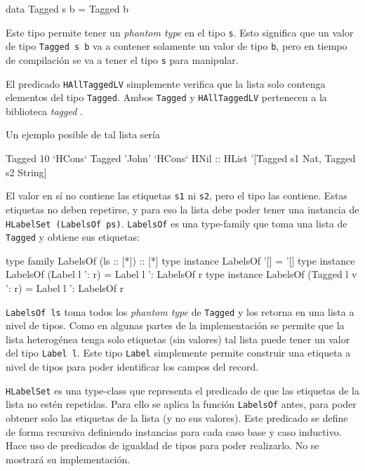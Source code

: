 \begin{code}
data Tagged s b = Tagged b
\end{code}

Este tipo permite tener un \textit{phantom type} en el tipo \texttt{s}. Esto significa que un valor de tipo \texttt{Tagged s b} va a contener solamente un valor de tipo \texttt{b}, pero en tiempo de compilación se va a tener el tipo \texttt{s} para manipular.

El predicado \texttt{HAllTaggedLV} simplemente verifica que la lista solo contenga elementos del tipo \texttt{Tagged}. Ambos \texttt{Tagged} y \texttt{HAllTaggedLV} pertenecen a la biblioteca \textit{tagged} \cite{Haskell:Tagged}. 

Un ejemplo posible de tal lista sería

\begin{code}
Tagged 10 `HCons` Tagged 'John' `HCons` HNil :: 
  HList '[Tagged s1 Nat, Tagged s2 String]
\end{code}

El valor en sí no contiene las etiquetas \texttt{s1} ni \texttt{s2}, pero el tipo las contiene. Estas etiquetas no deben repetirse, y para eso la lista debe poder tener una instancia de \texttt{HLabelSet (LabelsOf ps)}. \texttt{LabelsOf} es una type-family que toma una lista de \texttt{Tagged} y obtiene sus etiquetas:

\begin{code}
type family LabelsOf (ls :: [*]) :: [*]
type instance LabelsOf '[] = '[]
type instance LabelsOf (Label l ': r)  = Label l ': LabelsOf r
type instance LabelsOf (Tagged l v ': r) = Label l ': LabelsOf r
\end{code}

\texttt{LabelsOf ls} toma todos los \textit{phantom type} de \texttt{Tagged} y los retorna en una lista a nivel de tipos. Como en algunas partes de la implementación se permite que la lista heterogénea tenga solo etiquetas (sin valores) tal lista puede tener un valor del tipo \texttt{Label l}. Este tipo \texttt{Label} simplemente permite construir una etiqueta a nivel de tipos para poder identificar los campos del record.

\texttt{HLabelSet} es una type-class que representa el predicado de que las etiquetas de la lista no estén repetidas. Para ello se aplica la función \texttt{LabelsOf} antes, para poder obtener solo las etiquetas de la lista (y no sus valores). Este predicado se define de forma recursiva definiendo instancias para cada caso base y caso inductivo. Hace uso de predicados de igualdad de tipos para poder realizarlo. No se mostrará su implementación. 



